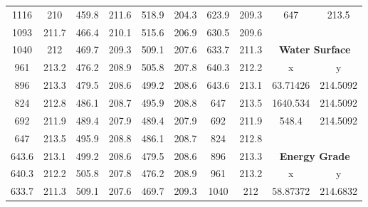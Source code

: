 \begin{center}
\begin{tabular}{|cccc||cccc||cc|}
    1116     & 210                     & 459.8 & 211.6                        & 518.9 & 204.3                     & 623.9 & 209.3                        & 647      & 213.5                              \\
    1093     & 211.7                   & 466.4 & 210.1                        & 515.6 & 206.9                     & 630.5 & 209.6                        &          &                                    \\
    1040     & 212                     & 469.7 & 209.3                        & 509.1 & 207.6                     & 633.7 & 211.3                        & \multicolumn{2}{c|}{\textbf{Water Surface}}   \\ 
    \cline{9-10}
    961      & 213.2                   & 476.2 & 208.9                        & 505.8 & 207.8                     & 640.3 & 212.2                        & x        & y                                  \\
    896      & 213.3                   & 479.5 & 208.6                        & 499.2 & 208.6                     & 643.6 & 213.1                        & 63.71426 & 214.5092                           \\
    824      & 212.8                   & 486.1 & 208.7                        & 495.9 & 208.8                     & 647   & 213.5                        & 1640.534 & 214.5092                           \\
    692      & 211.9                   & 489.4 & 207.9                        & 489.4 & 207.9                     & 692   & 211.9                        & 548.4    & 214.5092                           \\
    647      & 213.5                   & 495.9 & 208.8                        & 486.1 & 208.7                     & 824   & 212.8                        &          &                                    \\
    643.6    & 213.1                   & 499.2 & 208.6                        & 479.5 & 208.6                     & 896   & 213.3                        & \multicolumn{2}{c|}{\textbf{Energy Grade }}   \\ 
    \cline{9-10}
    640.3    & 212.2                   & 505.8 & 207.8                        & 476.2 & 208.9                     & 961   & 213.2                        & x        & y                                  \\
    633.7    & 211.3                   & 509.1 & 207.6                        & 469.7 & 209.3                     & 1040  & 212                          & 58.87372 & 214.6832                           \\

\end{tabular}
\end{center}
